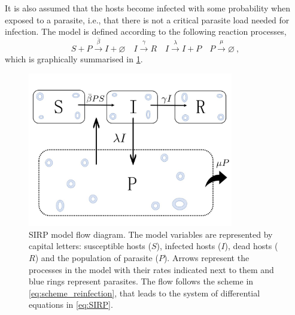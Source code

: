 It is also assumed that the hosts become infected with some probability when
exposed to a parasite, i.e., that there is not a critical parasite load needed
for infection.
The model is defined according to the following reaction processes,
\begin{equation}\label{eq:scheme_reinfection}
    S+P \stackrel{\bar{\beta}}{\rightarrow} I + \varnothing \quad I
    \stackrel{\gamma}{\rightarrow} R \quad I \stackrel{\lambda}{\rightarrow}
    I+P
    \quad P \stackrel{\mu}{\rightarrow} \varnothing \ ,
\end{equation}
which is graphically summarised in \cref{fig: SIRP_scheme}.

\begin{figure}[H]
    \centering
    \includegraphics[width=0.8\textwidth]{Figures/SIRP_scheme_mod.jpg}
    \caption{SIRP model flow diagram. The model variables are represented
        by capital letters: susceptible hosts ($S$), infected hosts ($I$), dead
        hosts
        ($R$) and the population of parasite ($P$). Arrows represent the
        processes in
        the model with their rates indicated next to them and blue rings
        represent
        parasites. The flow follows the scheme in \cref{eq:scheme_reinfection},
        that
        leads to the system of differential equations in \cref{eq:SIRP}.}
    \label{fig: SIRP_scheme}
\end{figure}

